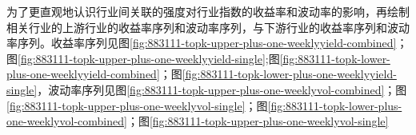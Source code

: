 \documentclass{sysuthesis}
\begin{document}

为了更直观地认识行业间关联的强度对行业指数的收益率和波动率的影响，再绘制相关行业的上游行业的收益率序列和波动率序列，与下游行业的收益率序列和波动率序列。收益率序列见图\ref{fig:883111-topk-upper-plus-one-weeklyyield-combined}；图\ref{fig:883111-topk-upper-plus-one-weeklyyield-single};图\ref{fig:883111-topk-lower-plus-one-weeklyyield-combined}；图\ref{fig:883111-topk-lower-plus-one-weeklyyield-single}，波动率序列见图\ref{fig:883111-topk-upper-plus-one-weeklyvol-combined}；图\ref{fig:883111-topk-upper-plus-one-weeklyvol-single}；图\ref{fig:883111-topk-lower-plus-one-weeklyvol-combined}；图\ref{fig:883111-topk-upper-plus-one-weeklyvol-single}
\end{document}
